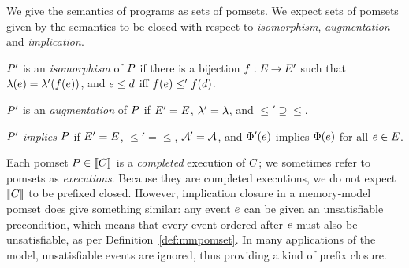 
We give the semantics of programs as sets of pomsets.  
%
We expect sets of pomsets given by the semantics to be closed with
respect to \emph{isomorphism}, \emph{augmentation} and \emph{implication}.
\begin{definition}
  $P'$ is an \emph{isomorphism} of $P$ if there is a bijection
  $f:E\mathbin\rightarrow E'$ such that $\lambda(e)=\lambda'(f(e))$, and
  $e\le d$ iff $f(e)\le'f(d)$. %

  $P'$ is an \emph{augmentation} of $P$ if $E'=E$,
  ${\lambda'}={\lambda}$, and ${\le'}\supseteq{\le}$. %

  $P'$ \emph{implies} $P$ if $E'=E$, ${\le'}={\le}$,
  $\mathcal{A}'=\mathcal{A}$, and $\Phi'(e)$
  implies $\Phi(e)$ for all $e\in E$.
\end{definition}
Each pomset $P\in\llbracket C\rrbracket$ is a \emph{completed} execution of $C$;
we sometimes refer to pomsets as \emph{executions}.  Because they are
completed executions, we do not expect $\llbracket C\rrbracket$ to be prefixed closed.
However, implication closure in a memory-model pomset does give something
similar: any event $e$ can be given an unsatisfiable precondition, which
means that every event ordered after $e$ must also be unsatisfiable, as
per Definition~\ref{def:mmpomset}.  In many applications of the model,
unsatisfiable events are ignored, thus providing a kind of prefix closure.


